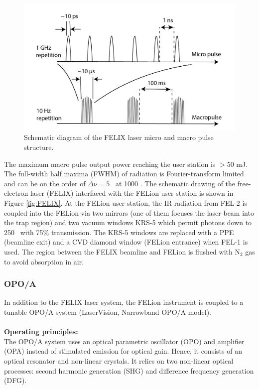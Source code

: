 \begin{figure}[!htb]
    \centering
    \includegraphics[scale=0.7]{figures/Instruments/FELIX-pulse-02.png}
    \caption{Schematic diagram of the FELIX laser micro and macro pulse structure.}
    \label{fig:FELIX-pulse}
\end{figure}

The maximum macro pulse output power reaching the user station is $> 50$ mJ. The full-width half maxima (FWHM) of radiation is Fourier-transform limited and can be on the order of $\Delta \nu = 5$ \wn\ at 1000 \wn. The schematic drawing of the free-electron laser (FELIX) interfaced with the FELion user station is shown in Figure \ref{fig:FELIX}. At the FELion user station, the IR radiation from FEL-2 is coupled into the FELion via two mirrors (one of them focuses the laser beam into the trap region) and two vacuum windows KRS-5 which permit photons down to 250 \wn\ with 75\% transmission. The KRS-5 windows are replaced with a PPE (beamline exit) and a CVD diamond window (FELion entrance) when FEL-1 is used. The region between the FELIX beamline and FELion is flushed with N$_2$ gas to avoid absorption in air.

\subsubsection{OPO/A}
\label{subsec:ir:radiation-source:OPO}

In addition to the FELIX laser system, the FELion instrument is coupled to a tunable OPO/A system (LaserVision, Narrowband OPO/A model).\\
\\
\textbf{Operating principles:}\\

The OPO/A system uses an optical parametric oscillator (OPO) and amplifier (OPA) 
instead of stimulated emission for optical gain. Hence, it consists of an optical resonator and non-linear crystals. 
It relies on two non-linear optical processes: second harmonic generation (SHG) and difference frequency generation (DFG).

